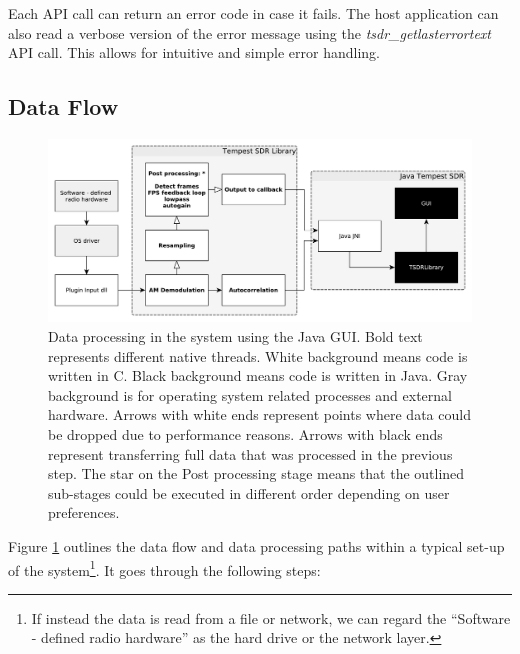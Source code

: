 \documentclass[a4paper,12pt,twoside,openright]{report}
\begin{document}
Each API call can return an error code in case it fails. The host application can also read a verbose version of the error message using the \textit{tsdr\_getlasterrortext} API call. This allows for intuitive and simple error handling.

\subsection{Data Flow}

\begin{figure}[h]
  \centering
    \includegraphics[width=\textwidth]{systemoverview}
    \caption{Data processing in the system using the Java GUI. Bold text represents different native threads. White background means code is written in C. Black background means code is written in Java. Gray background is for operating system related processes and external hardware. Arrows with white ends represent points where data could be dropped due to performance reasons. Arrows with black ends represent transferring full data that was processed in the previous step. The star on the Post processing stage means that the outlined sub-stages could be executed in different order depending on user preferences.}
    \label{fig:architecture}
\end{figure}

Figure \ref{fig:architecture} outlines the data flow and data processing paths within a typical set-up of the system\footnote{If instead the data is read from a file or network, we can regard the ``Software - defined radio hardware'' as the hard drive or the network layer.}. It goes through the following steps:
\end{document}
